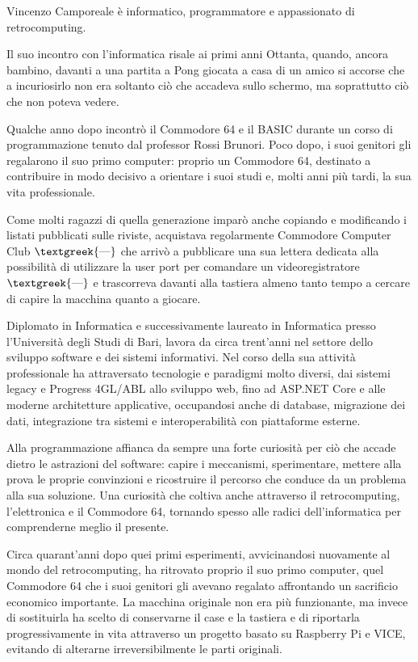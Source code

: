 \documentclass{article}
\author{HP}
\date{2026-08-19}
\begin{document}
Vincenzo Camporeale è informatico, programmatore e appassionato di retrocomputing.

Il suo incontro con l'informatica risale ai primi anni Ottanta, quando, ancora bambino, davanti a una partita a Pong
giocata a casa di un amico si accorse che a incuriosirlo non era soltanto ciò che accadeva sullo schermo, ma
soprattutto ciò che non poteva vedere.

Qualche anno dopo incontrò il Commodore 64 e il BASIC durante un corso di programmazione tenuto dal professor Rossi
Brunori. Poco dopo, i suoi genitori gli regalarono il suo primo computer: proprio un Commodore 64, destinato a
contribuire in modo decisivo a orientare i suoi studi e, molti anni più tardi, la sua vita professionale.

Come molti ragazzi di quella generazione imparò anche copiando e modificando i listati pubblicati sulle riviste,
acquistava regolarmente Commodore Computer Club $\text{\textgreek{—}}$ che arrivò a pubblicare una sua lettera dedicata
alla possibilità di utilizzare la user port per comandare un videoregistratore $\text{\textgreek{—}}$ e trascorreva
davanti alla tastiera almeno tanto tempo a cercare di capire la macchina quanto a giocare.

Diplomato in Informatica e successivamente laureato in Informatica presso l'Università degli Studi di Bari, lavora da
circa trent'anni nel settore dello sviluppo software e dei sistemi informativi. Nel corso della sua attività
professionale ha attraversato tecnologie e paradigmi molto diversi, dai sistemi legacy e Progress 4GL/ABL allo sviluppo
web, fino ad ASP.NET Core e alle moderne architetture applicative, occupandosi anche di database, migrazione dei dati,
integrazione tra sistemi e interoperabilità con piattaforme esterne.

Alla programmazione affianca da sempre una forte curiosità per ciò che accade dietro le astrazioni del software: capire
i meccanismi, sperimentare, mettere alla prova le proprie convinzioni e ricostruire il percorso che conduce da un
problema alla sua soluzione. Una curiosità che coltiva anche attraverso il retrocomputing, l'elettronica e il Commodore
64, tornando spesso alle radici dell'informatica per comprenderne meglio il presente.

Circa quarant'anni dopo quei primi esperimenti, avvicinandosi nuovamente al mondo del retrocomputing, ha ritrovato
proprio il suo primo computer, quel Commodore 64 che i suoi genitori gli avevano regalato affrontando un sacrificio
economico importante. La macchina originale non era più funzionante, ma invece di sostituirla ha scelto di conservarne
il case e la tastiera e di riportarla progressivamente in vita attraverso un progetto basato su Raspberry Pi e VICE,
evitando di alterarne irreversibilmente le parti originali.
\end{document}
